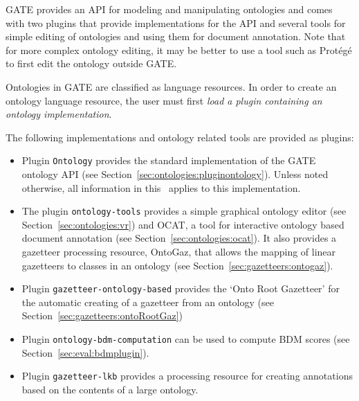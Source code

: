 

GATE provides an API for modeling and manipulating ontologies and 
comes with two plugins that provide implementations for the API  
and several tools for simple editing of ontologies and using them for document annotation.
Note that for more complex ontology editing, it may be better to use a tool such as Protégé to first edit the ontology outside GATE.



Ontologies in GATE are classified as language resources. In order to create 
an ontology language resource, the user must first  
\emph{load a plugin containing an ontology implementation}.

The following implementations and ontology related tools are provided 
as plugins:
\begin{itemize}
\item Plugin \texttt{Ontology} provides the standard implementation of the GATE
ontology API (see Section~\ref{sec:ontologies:pluginontology}).
Unless noted otherwise, all information in this \chapthing\ applies to this
implementation.
\item The plugin \texttt{ontology-tools} provides a simple graphical ontology 
editor (see Section~\ref{sec:ontologies:vr}) and OCAT, a tool for interactive ontology based
document annotation (see Section~\ref{sec:ontologies:ocat}). It also provides a gazetteer
processing resource, OntoGaz, that allows the mapping of linear 
gazetteers to classes in an ontology (see Section~\ref{sec:gazetteers:ontogaz}).
\item Plugin \texttt{gazetteer-ontology-based} provides the `Onto Root
Gazetteer' for the automatic creating of a gazetteer from an ontology 
(see Section~\ref{sec:gazetteers:ontoRootGaz})
\item Plugin \texttt{ontology-bdm-computation} can be used to compute BDM
scores (see Section~\ref{sec:eval:bdmplugin}).
\item Plugin \texttt{gazetteer-lkb} provides a processing resource for
creating annotations based on the contents of a large ontology.
\end{itemize}

